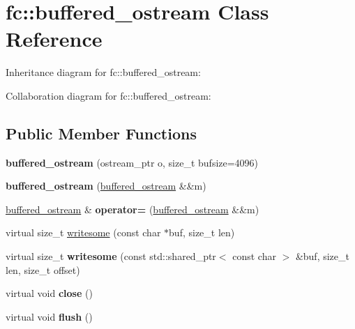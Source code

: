 \hypertarget{classfc_1_1buffered__ostream}{}\section{fc\+:\+:buffered\+\_\+ostream Class Reference}
\label{classfc_1_1buffered__ostream}


Inheritance diagram for fc\+:\+:buffered\+\_\+ostream\+:


Collaboration diagram for fc\+:\+:buffered\+\_\+ostream\+:
\subsection*{Public Member Functions}
\begin{DoxyCompactItemize}
\item 
\mbox{\label{classfc_1_1buffered__ostream_a4367cbee8f5059b5e7e35a23b1304170}} 
{\bfseries buffered\+\_\+ostream} (ostream\+\_\+ptr o, size\+\_\+t bufsize=4096)
\item 
\mbox{\label{classfc_1_1buffered__ostream_a14ece07d037569bcb5eccc00fcd2ad67}} 
{\bfseries buffered\+\_\+ostream} (\mbox{\hyperlink{classfc_1_1buffered__ostream}{buffered\+\_\+ostream}} \&\&m)
\item 
\mbox{\label{classfc_1_1buffered__ostream_ac6b4fd3956ec31f976ad50da28bbef2b}} 
\mbox{\hyperlink{classfc_1_1buffered__ostream}{buffered\+\_\+ostream}} \& {\bfseries operator=} (\mbox{\hyperlink{classfc_1_1buffered__ostream}{buffered\+\_\+ostream}} \&\&m)
\item 
virtual size\+\_\+t \mbox{\hyperlink{classfc_1_1buffered__ostream_a97aa6bcd47b0506a080779840fffd493}{writesome}} (const char $\ast$buf, size\+\_\+t len)
\item 
\mbox{\label{classfc_1_1buffered__ostream_a5cb49f9fc76f6de2ff3014fc35c46d50}} 
virtual size\+\_\+t {\bfseries writesome} (const std\+::shared\+\_\+ptr$<$ const char $>$ \&buf, size\+\_\+t len, size\+\_\+t offset)
\item 
\mbox{\label{classfc_1_1buffered__ostream_a6eb86db89b1da6af7fd4cbe52c24a0ed}} 
virtual void {\bfseries close} ()
\item 
\mbox{\label{classfc_1_1buffered__ostream_a2701105d24596d7990e73ec940b134ab}} 
virtual void {\bfseries flush} ()
\end{DoxyCompactItemize}


